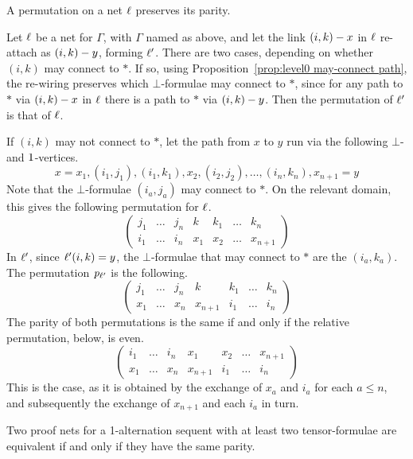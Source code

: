 \documentclass[conference]{IEEEtran}
\begin{document}
\begin{proposition}
\label{prop:level0 min binary}
A permutation on a net $\links$ preserves its parity. 
\end{proposition}


\begin{IEEEproof}
Let $\links$ be a net for $\Gamma$, with $\Gamma$ named as above, and let the link $\edge{(i,k)}x$ in $\links$ re-attach as $\edge{(i,k)}y$, forming $\links'$.
%
There are two cases, depending on whether $(i,k)$ may connect to $*$.
%
If so, using Proposition~\ref{prop:level0 may-connect path}, the re-wiring preserves which $\bot$-formulae may connect to $*$, since for any path to $*$ via $\edge{(i,k)}x$ in $\links$ there is a path to $*$ via $\edge{(i,k)}y$.
%
Then the permutation of $\links'$ is that of $\links$.


If $(i,k)$ may not connect to $*$, let the path from $x$ to $y$ run via the following $\bot$- and $\1$-vertices.
\[
	x=x_1, (i_1,j_1), (i_1,k_1), x_2, (i_2,j_2), \dotsc, (i_n,k_n), x_{n+1}=y 	
\]
Note that the $\bot$-formulae $(i_a,j_a)$ may connect to $*$.
%
On the relevant domain, this gives the following permutation for $\links$.
\[
\left(\begin{array}{ccccccc}
	j_1 & \dotso & j_n &  k  & k_1 & \dotso & k_n \\
	i_1 & \dotso & i_n & x_1 & x_2 & \dotso & x_{n+1}
\end{array}\right)
\]
In $\links'$, since $\links'(i,k)=y$, the $\bot$-formulae that may connect to $*$ are the $(i_a,k_a)$.
%
The permutation $\prm[\links']$ is the following.
\[
\left(\begin{array}{ccccccc}
	j_1 & \dotso & j_n &    k    & k_1 & \dotso & k_n \\
	x_1 & \dotso & x_n & x_{n+1} & i_1 & \dotso & i_n
\end{array}\right)
\]
The parity of both permutations is the same if and only if the relative permutation, below, is even.
\[
\left(\begin{array}{ccccccc}
	i_1 & \dotso & i_n & x_1     & x_2 & \dotso & x_{n+1} \\
	x_1 & \dotso & x_n & x_{n+1} & i_1 & \dotso & i_n
\end{array}\right)
\]
This is the case, as it is obtained by the exchange of $x_a$ and $i_a$ for each $a\leq n$, and subsequently the exchange of $x_{n+1}$ and each $i_a$ in turn.
%
\end{IEEEproof}



\begin{proposition}
\label{prop:parity determines equivalence}
Two proof nets for a 1-alternation sequent with at least two tensor-formulae are equivalent if and only if they have the same parity.
\end{proposition}
\end{document}
